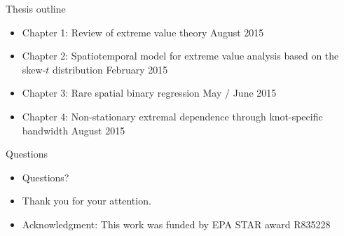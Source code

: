 \documentclass{beamer}
\begin{document}
\begin{frame}{Thesis outline}
  \begin{itemize} \setlength{\itemsep}{1em}
    \item Chapter 1: Review of extreme value theory \alert{August 2015}
    \item Chapter 2: Spatiotemporal model for extreme value analysis based on the skew-$t$ distribution \alert{February 2015}
    \item Chapter 3: Rare spatial binary regression \alert{May / June 2015}
    \item Chapter 4: Non-stationary extremal dependence through knot-specific bandwidth \alert{August 2015}
  \end{itemize}
\end{frame}

\begin{frame}{Questions}
  \begin{itemize} \setlength{\itemsep}{1em}
    \item Questions?
    \item Thank you for your attention.
    \item Acknowledgment: This work was funded by EPA STAR award R835228
  \end{itemize}
\end{frame}
\end{document}

